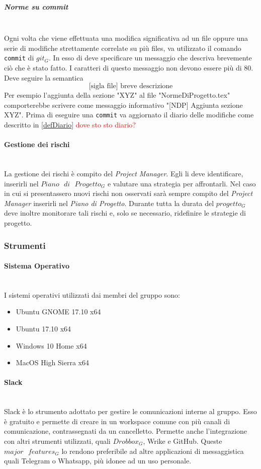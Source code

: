 			\subparagraph{Norme su commit}\mbox{} \\
			Ogni volta che viene effettuata una modifica significativa ad un file oppure una serie di modifiche strettamente correlate su più files, va utilizzato il comando \texttt{commit} di $git_G$. In esso di deve specificare un messaggio che descriva brevemente ciò che è stato fatto. I caratteri di questo messaggio non devono essere più di 80. Deve seguire la semantica
			$$\text{[sigla file] breve descrizione}$$
			Per esempio l'aggiunta della sezione "XYZ" al file "NormeDiProgetto.tex" comporterebbe scrivere come messaggio informativo "[NDP] Aggiunta sezione XYZ". Prima di eseguire una \texttt{commit} va aggiornato il diario delle modifiche come descritto in \ref{defDiario} \textcolor{red}{dove sto sto diario?} 
			
		\paragraph{Gestione dei rischi} \mbox{} \\
		La gestione dei rischi è compito del \emph{Project Manager}. Egli li deve identificare, inserirli nel $Piano\text{ }di\text{ }Progetto_G$ e valutare una strategia per affrontarli. Nel caso in cui si presentassero nuovi rischi non osservati sarà sempre compito del \emph{Project Manager} inserirli nel \emph{Piano di Progetto}. Durante tutta la durata del $progetto_G$ deve inoltre monitorare tali rischi e, solo se necessario, ridefinire le strategie di progetto.
		
	\subsubsection{Strumenti}
		\paragraph{Sistema Operativo} \mbox{} \\
		I sistemi operativi utilizzati dai membri del gruppo sono:
		\begin{itemize}
			\item Ubuntu GNOME 17.10 x64
			\item Ubuntu 17.10 x64
			\item Windows 10 Home x64
			\item MacOS High Sierra x64
		\end{itemize}
		
		\paragraph{Slack}\mbox{} \\
		Slack è lo strumento adottato per gestire le comunicazioni interne al gruppo. Esso è gratuito e permette di creare in un workspace comune con più canali di comunicazione, contrassegnati da un cancelletto. Permette anche l'integrazione con altri strumenti utilizzati, quali $Drobbox_G$, Wrike e GitHub. Queste $major\text{ }features_G$ lo rendono preferibile ad altre applicazioni di messaggistica quali Telegram o Whatsapp, più idonee ad un uso personale. 
		
